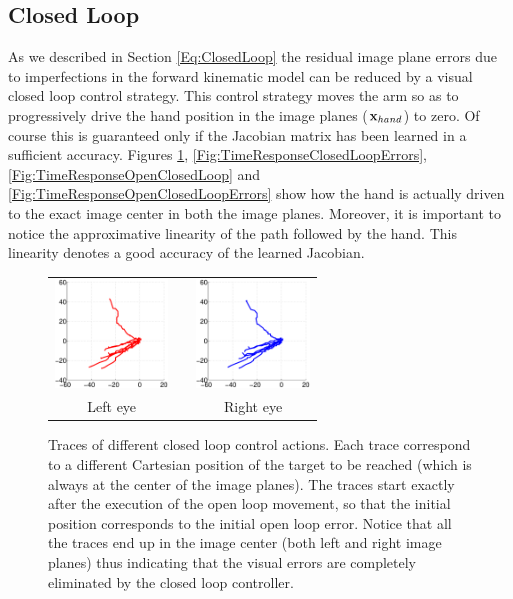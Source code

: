 \subsection{Closed Loop}

As we described in Section \ref{Eq:ClosedLoop} the residual image plane errors 
due to imperfections in the forward kinematic model can be reduced by a visual closed loop
control strategy. This control strategy moves the arm so as to progressively 
drive the hand position in the image planes ($\mathbf{x}_{hand}$) to zero. Of course this is guaranteed 
only if the  Jacobian matrix has been learned in a sufficient accuracy. Figures 
\ref{Fig:ImagePlaneClosedLoopErrors}, \ref{Fig:TimeResponseClosedLoopErrors},  \ref{Fig:TimeResponseOpenClosedLoop} and \ref{Fig:TimeResponseOpenClosedLoopErrors} 
show how the hand is actually driven to the 
exact image center in both the image planes. Moreover, it is important to notice the
approximative linearity of the path followed by the hand. This linearity denotes 
a good accuracy of the learned Jacobian.

\begin{figure}
  \begin{center}
	\begin{tabular}{ccc}
	  \parbox{30mm}{\includegraphics[width=30mm]{Figure/LeftEyeClosedLoop.eps}}  & \hspace{.1cm} &
	  \parbox{30mm}{\includegraphics[width=30mm]{Figure/RightEyeClosedLoop.eps}}
	  \\
	  \parbox{30mm}{\centering Left eye } & \hspace{0.1cm} & \parbox{30mm}{\centering Right eye }
  \end{tabular}
\end{center}
\caption{Traces of different closed loop control actions. Each trace correspond to a different Cartesian position of the target to be reached (which 
is always at the center of the image planes). The traces start exactly after the execution of the open loop movement, so that the initial position corresponds to the initial open loop error. Notice that all the traces end up in the image center (both left and right image planes) thus indicating that the visual errors are completely eliminated by the closed loop controller.}\label{Fig:ImagePlaneClosedLoopErrors}
  \end{figure}

